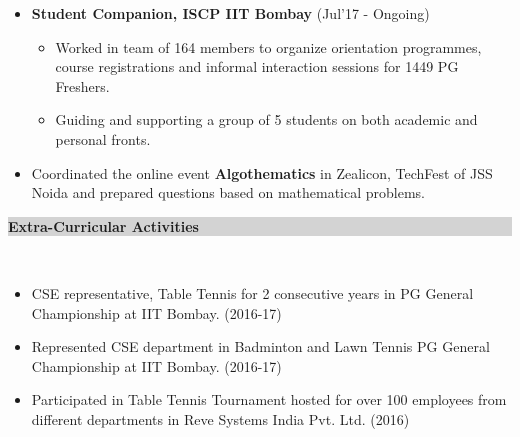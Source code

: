 \documentclass[a4paper,10pt]{article}
\newcommand{\sectsep}{-0.3cm}
\newcommand{\lsep}{-0.5cm}
\newcommand{\psep}{-0.5cm}
\newcommand{\hsep}{-0.6cm}
\newcommand{\resheading}[1]{{\small \colorbox{lightgray}{\begin{minipage}{0.975\textwidth}{\textbf{#1 \vphantom{p\^{E}}}}\end{minipage}}}}
\begin{document}
\begin{itemize}
\begin{itemize}
       \end{itemize}
       
	\item \textbf{Student Companion, ISCP IIT Bombay} \hfill (Jul'17 - Ongoing) \\[\hsep]
		\begin{itemize}
        	\item \noindent Worked in team of 164 members to organize orientation programmes, course registrations and informal interaction sessions for 1449 PG Freshers.  \\[-0.5cm]
        	\item \noindent Guiding and supporting a group of 5 students on both academic and personal fronts. \\[\psep]
     	\end{itemize} 
         \vspace{-0.3cm}
        
        
 
 \item \noindent Coordinated the online event \textbf{Algothematics} in Zealicon, TechFest of JSS Noida and prepared questions based on mathematical problems.  \\[\sectsep]
\end{itemize}




\resheading{\textbf{\large Extra-Curricular Activities}}\\ [\lsep]
\begin{itemize}
\item CSE representative, Table Tennis for 2 consecutive years in PG General Championship at IIT Bombay. \hfill (2016-17)\\[\hsep]
\item \noindent Represented CSE department in Badminton and Lawn Tennis PG General Championship at IIT Bombay. \hfill (2016-17) \\[\hsep]
\item \noindent Participated in Table Tennis Tournament hosted for over 100 employees from different departments in Reve Systems India Pvt. Ltd. \hfill (2016)\\[\hsep]
\end{itemize}
\end{document}
